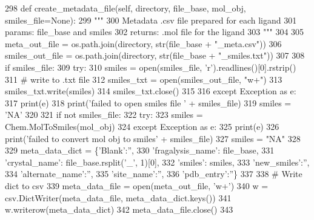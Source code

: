\begin{DoxyCode}
298     \textcolor{keyword}{def }create\_metadata\_file(self, directory, file\_base, mol\_obj, smiles\_file=None):
299         \textcolor{stringliteral}{"""}
300 \textcolor{stringliteral}{        Metadata .csv file prepared for each ligand}
301 \textcolor{stringliteral}{        params: file\_base and smiles}
302 \textcolor{stringliteral}{        returns: .mol file for the ligand}
303 \textcolor{stringliteral}{        """}
304 
305         meta\_out\_file = os.path.join(directory, str(file\_base + \textcolor{stringliteral}{"\_meta.csv"}))
306         smiles\_out\_file = os.path.join(directory, str(file\_base + \textcolor{stringliteral}{"\_smiles.txt"}))
307 
308         \textcolor{keywordflow}{if} smiles\_file:
309             \textcolor{keywordflow}{try}:
310                 smiles = open(smiles\_file, \textcolor{stringliteral}{'r').readlines()[0].rstrip()}
311 \textcolor{stringliteral}{                }\textcolor{comment}{# write to .txt file}
312                 smiles\_txt = open(smiles\_out\_file, \textcolor{stringliteral}{"w+"})
313                 smiles\_txt.write(smiles)
314                 smiles\_txt.close()
315 
316             \textcolor{keywordflow}{except} Exception \textcolor{keyword}{as} e:
317                 print(e)
318                 print(\textcolor{stringliteral}{'failed to open smiles file '} + smiles\_file)
319                 smiles = \textcolor{stringliteral}{'NA'}
320 
321         \textcolor{keywordflow}{if} \textcolor{keywordflow}{not} smiles\_file:
322             \textcolor{keywordflow}{try}:
323                 smiles = Chem.MolToSmiles(mol\_obj)
324             \textcolor{keywordflow}{except} Exception \textcolor{keyword}{as} e:
325                 print(e)
326                 print(\textcolor{stringliteral}{'failed to convert mol obj to smiles'} + smiles\_file)
327                 smiles = \textcolor{stringliteral}{"NA"}
328 
329         meta\_data\_dict = \{\textcolor{stringliteral}{'Blank'}:\textcolor{stringliteral}{''},
330                           \textcolor{stringliteral}{'fragalysis\_name'}: file\_base,
331                           \textcolor{stringliteral}{'crystal\_name'}: file\_base.rsplit(\textcolor{stringliteral}{'\_'}, 1)[0],
332                           \textcolor{stringliteral}{'smiles'}: smiles,
333                           \textcolor{stringliteral}{'new\_smiles'}:\textcolor{stringliteral}{''},
334                           \textcolor{stringliteral}{'alternate\_name'}:\textcolor{stringliteral}{''},
335                           \textcolor{stringliteral}{'site\_name'}:\textcolor{stringliteral}{''},
336                           \textcolor{stringliteral}{'pdb\_entry'}:\textcolor{stringliteral}{''}\}
337 
338         \textcolor{comment}{# Write dict to csv}
339         meta\_data\_file = open(meta\_out\_file, \textcolor{stringliteral}{'w+'})
340         w = csv.DictWriter(meta\_data\_file, meta\_data\_dict.keys())
341         w.writerow(meta\_data\_dict)
342         meta\_data\_file.close()
343 
\end{DoxyCode}
